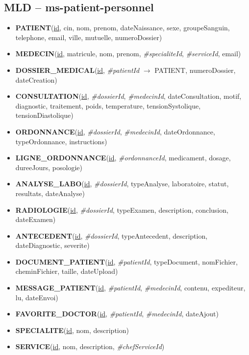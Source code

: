 \subsection{MLD -- ms-patient-personnel}
\begin{itemize}[itemsep=2pt]
  \item \textbf{PATIENT}(\underline{id}, cin, nom, prenom, dateNaissance, sexe, groupeSanguin, telephone, email, ville, mutuelle, numeroDossier)
  \item \textbf{MEDECIN}(\underline{id}, matricule, nom, prenom, \textit{\#specialiteId}, \textit{\#serviceId}, email)
  \item \textbf{DOSSIER\_MEDICAL}(\underline{id}, \textit{\#patientId} $\to$ PATIENT, numeroDossier, dateCreation)
  \item \textbf{CONSULTATION}(\underline{id}, \textit{\#dossierId}, \textit{\#medecinId}, dateConsultation, motif, diagnostic, traitement, poids, temperature, tensionSystolique, tensionDiastolique)
  \item \textbf{ORDONNANCE}(\underline{id}, \textit{\#dossierId}, \textit{\#medecinId}, dateOrdonnance, typeOrdonnance, instructions)
  \item \textbf{LIGNE\_ORDONNANCE}(\underline{id}, \textit{\#ordonnanceId}, medicament, dosage, dureeJours, posologie)
  \item \textbf{ANALYSE\_LABO}(\underline{id}, \textit{\#dossierId}, typeAnalyse, laboratoire, statut, resultats, dateAnalyse)
  \item \textbf{RADIOLOGIE}(\underline{id}, \textit{\#dossierId}, typeExamen, description, conclusion, dateExamen)
  \item \textbf{ANTECEDENT}(\underline{id}, \textit{\#dossierId}, typeAntecedent, description, dateDiagnostic, severite)
  \item \textbf{DOCUMENT\_PATIENT}(\underline{id}, \textit{\#patientId}, typeDocument, nomFichier, cheminFichier, taille, dateUpload)
  \item \textbf{MESSAGE\_PATIENT}(\underline{id}, \textit{\#patientId}, \textit{\#medecinId}, contenu, expediteur, lu, dateEnvoi)
  \item \textbf{FAVORITE\_DOCTOR}(\underline{id}, \textit{\#patientId}, \textit{\#medecinId}, dateAjout)
  \item \textbf{SPECIALITE}(\underline{id}, nom, description)
  \item \textbf{SERVICE}(\underline{id}, nom, description, \textit{\#chefServiceId})
\end{itemize}

